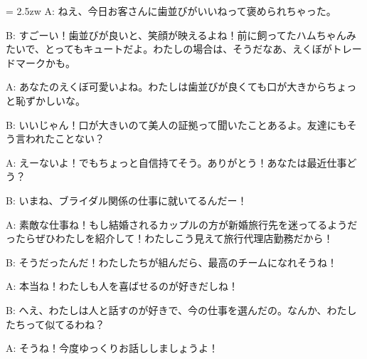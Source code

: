 \documentclass[11pt]{amsart}
\title{}
\author{}
\newenvironment{hangall}[1]{\hangindent = 2.5zw\everypar{\hangindent = 2.5zw}}{}
\begin{document}
\maketitle
\begin{hangall}{}%
A: ねえ、今日お客さんに歯並びがいいねって褒められちゃった。

B: すごーい！歯並びが良いと、笑顔が映えるよね！前に飼ってたハムちゃんみたいで、とってもキュートだよ。わたしの場合は、そうだなあ、えくぼがトレードマークかも。

A: あなたのえくぼ可愛いよね。わたしは歯並びが良くても口が大きからちょっと恥ずかしいな。

B: いいじゃん！口が大きいのて美人の証拠って聞いたことあるよ。友達にもそう言われたことない？

A: えーないよ！でもちょっと自信持てそう。ありがとう！あなたは最近仕事どう？

B: いまね、ブライダル関係の仕事に就いてるんだー！

A: 素敵な仕事ね！もし結婚されるカップルの方が新婚旅行先を迷ってるようだったらぜひわたしを紹介して！わたしこう見えて旅行代理店勤務だから！

B: そうだったんだ！わたしたちが組んだら、最高のチームになれそうね！

A: 本当ね！わたしも人を喜ばせるのが好きだしね！

B: へえ、わたしは人と話すのが好きで、今の仕事を選んだの。なんか、わたしたちって似てるわね？

A: そうね！今度ゆっくりお話ししましょうよ！
\end{hangall}
\end{document}

